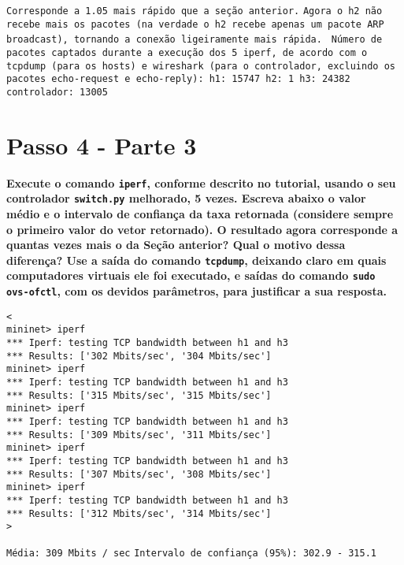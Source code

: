 \documentclass[12pt,letterpaper]{article}
\begin{document}
\texttt{Corresponde a 1.05 mais rápido que a seção anterior.}
\newline
\newline
\texttt{Agora o h2 não recebe mais os pacotes (na verdade o h2 recebe apenas um pacote ARP broadcast), tornando a conexão ligeiramente mais rápida. }
\newline
\newline
\texttt{Número de pacotes captados durante a execução dos 5 iperf, de acordo com o tcpdump (para os hosts) e wireshark (para o controlador, excluindo os pacotes echo-request e echo-reply): \newline
h1: 15747 \newline
h2: 1 \newline
h3: 24382 \newline
controlador: 13005  }




\section{Passo 4 - Parte 3}

\textbf{Execute o comando \texttt{iperf}, conforme descrito no
tutorial, usando o seu controlador \texttt{switch.py} melhorado, 5
vezes. Escreva abaixo o valor médio e o intervalo de confiança da taxa
retornada (considere sempre o primeiro valor do vetor retornado). O
resultado agora corresponde a quantas vezes mais o da Seção anterior?
Qual o motivo dessa diferença? Use a saída do comando
\texttt{tcpdump}, deixando claro em quais computadores virtuais ele
foi executado, e saídas do comando \texttt{sudo ovs-ofctl}, com os
devidos parâmetros, para justificar a sua resposta.}

\begin{verbatim}
<
mininet> iperf
*** Iperf: testing TCP bandwidth between h1 and h3
*** Results: ['302 Mbits/sec', '304 Mbits/sec']
mininet> iperf
*** Iperf: testing TCP bandwidth between h1 and h3
*** Results: ['315 Mbits/sec', '315 Mbits/sec']
mininet> iperf
*** Iperf: testing TCP bandwidth between h1 and h3
*** Results: ['309 Mbits/sec', '311 Mbits/sec']
mininet> iperf
*** Iperf: testing TCP bandwidth between h1 and h3
*** Results: ['307 Mbits/sec', '308 Mbits/sec']
mininet> iperf
*** Iperf: testing TCP bandwidth between h1 and h3
*** Results: ['312 Mbits/sec', '314 Mbits/sec']
>

\end{verbatim}

\texttt{Média: 309 Mbits / sec} \newline
\texttt{Intervalo de confiança (95\%): 302.9 - 315.1 } \newline \newline
\end{document}
